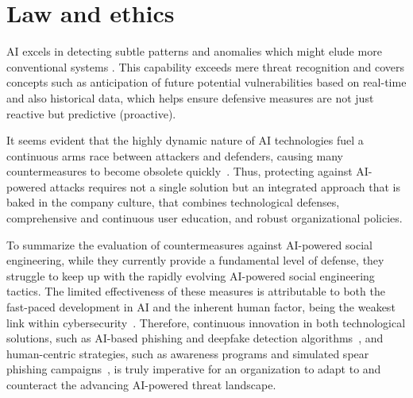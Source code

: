 \section{Law and ethics}
\begin{comment}    
    - Deepfake content detection
    - Spear phishing detection
\end{comment}


    AI excels in detecting subtle patterns and anomalies which might elude more conventional systems \citep{fakhouri_AI_Driven_Solutions_SE_Attacks_2024}. This capability exceeds mere threat recognition and covers concepts such as anticipation of future potential vulnerabilities based on real-time and also historical data, which helps ensure defensive measures are not just reactive but predictive (proactive).

It seems evident that the highly dynamic nature of AI technologies fuel a continuous arms race between attackers and defenders, causing many countermeasures to become obsolete quickly~\citep{fakhouri_AI_Driven_Solutions_SE_Attacks_2024}. Thus, protecting against AI-powered attacks requires not a single solution but an integrated approach that is baked in the company culture, that combines technological defenses, comprehensive and continuous user education, and robust organizational policies.

To summarize the evaluation of countermeasures against AI-powered social engineering, while they currently provide a fundamental level of defense, they struggle to keep up with the rapidly evolving AI-powered social engineering tactics. The limited effectiveness of these measures is attributable to both the fast-paced development in AI and the inherent human factor, being the weakest link within cybersecurity~\citep{mitnick_The_Art_of_Deception_2003}. Therefore, continuous innovation in both technological solutions, such as AI-based phishing and deepfake detection algorithms~\citep{mirsky_Creation_Detection_Deepfakes_2021}, and human-centric strategies, such as awareness programs and simulated spear phishing campaigns~\citep{salahdineSocialEngineeringAttacks2019}, is truly imperative for an organization to adapt to and counteract the advancing AI-powered threat landscape.

